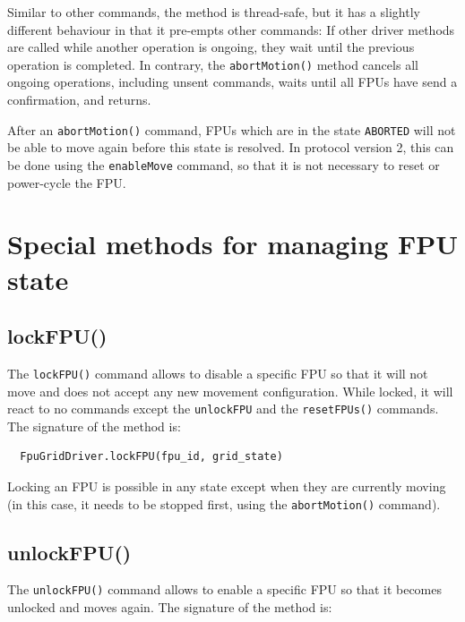 \documentclass[fontsize=12,a4paper]{scrreprt}
\begin{document}
Similar to other commands, the method is thread-safe, but it has a
slightly different behaviour in that it pre-empts other commands: If
other driver methods are called while another operation is ongoing,
they wait until the previous operation is completed. In contrary, the
\texttt{abortMotion()} method cancels all ongoing operations,
including unsent commands, waits until all FPUs have send a
confirmation, and returns.

After an \texttt{abortMotion()} command, FPUs which are in the state
\texttt{ABORTED} will not be able to move again before this state is
resolved. In protocol version 2, this can be done using the
\texttt{enableMove} command, so that it is not necessary to reset or
power-cycle the FPU.


\chapter{Special methods for managing FPU state}
\minitoc

\section{lockFPU()}
\label{sec:lockFPU}
 

The \texttt{lockFPU()} command allows to disable a specific FPU so
that it will not move and does not accept any new movement
configuration.  While locked, it will react to no commands except the
\texttt{unlockFPU} and the \texttt{resetFPUs()} commands.
The signature of the method is:

\begin{verbatim}
  FpuGridDriver.lockFPU(fpu_id, grid_state)
\end{verbatim}


Locking an FPU is possible in any state except when they are currently
moving (in this case, it needs to be stopped first, using the
\texttt{abortMotion()} command).


\section{unlockFPU()}
\label{sec:unlockFPU}

The \texttt{unlockFPU()} command allows to enable a specific FPU so
that it becomes unlocked and moves again.
The signature of the method is:
\end{document}
